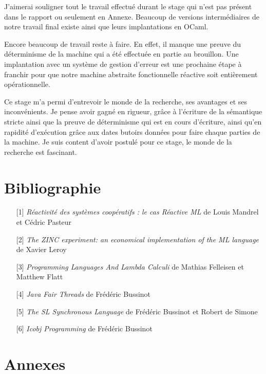 \documentclass[10pt,a4paper]{report}
\begin{document}
	J'aimerai souligner tout le travail effectué durant le stage qui n'est pas présent dans le rapport ou seulement en Annexe. Beaucoup de versions intermédiaires de notre travail final existe ainsi que leurs implantations en OCaml.
	\medbreak
	
	Encore beaucoup de travail reste à faire. En effet, il manque une preuve du déterminisme de la machine qui a été effectuée en partie au brouillon. Une implantation avec un système de gestion d'erreur est une prochaine étape à franchir pour que notre machine abstraite fonctionnelle réactive soit entièrement opérationnelle.
	\medbreak
	
	Ce stage m'a permi d'entrevoir le monde de la recherche, ses avantages et ses inconvénients. Je pense avoir gagné en rigueur, grâce à l'écriture de la sémantique stricte ainsi que la preuve de déterminisme qui est en cours d'écriture, ainsi qu'en rapidité d'exécution grâce aux dates butoirs données pour faire chaque parties de la machine. Je suis content d'avoir postulé pour ce stage, le monde de la recherche est fascinant.
	
	
	
	\chapter*{Bibliographie}\label{biblio}
	
	\begin{itemize}
		\item[] [1] \textit{Réactivité des systèmes coopératifs : le cas Réactive ML} de Louis Mandrel et Cédric Pasteur\label{ReactiveML}
		\item[] [2] \textit{The ZINC experiment: an economical implementation of the ML language} de Xavier Leroy\label{ZINC}
		\item[] [3] \textit{Programming Languages And Lambda Calculi} de Mathias Felleisen et Matthew Flatt\label{Calculi}
		\item[] [4] \textit{Java Fair Threads} de Frédéric Bussinot \label{FT} 
		\item[] [5] \textit{The SL Synchronous Language} de Frédéric Bussinot et Robert de Simone \label{SL}
		\item[] [6] \textit{Icobj Programming} de Frédéric Bussinot \label{IJ}
	\end{itemize}
	
	\chapter*{Annexes}
	
\end{document}

